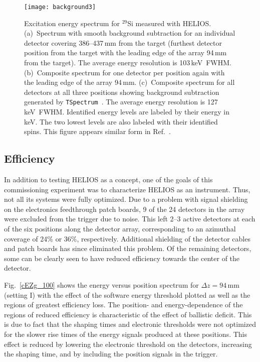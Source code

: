 \begin{figure}[hb!]
\centering
\texttt{[image: background3]}
\caption[Excitation energy spectrum for $^{29}$Si measured with HELIOS]{Excitation energy spectrum for $^{29}$Si measured with HELIOS.  
(a)~Spectrum with smooth background subtraction for an individual detector covering 386--437\,mm from the target (furthest detector position from the target with the leading edge of the array 94\,mm from the target).  The average energy resolution is 103\,keV~FWHM.  
(b)~Composite spectrum for one detector per position again with the leading edge of the array 94\,mm. 
(c)~Composite spectrum for all detectors at all three positions showing background subtraction generated by \texttt{TSpectrum}~\cite{Morhac_2000}.  The average energy resolution is 127\,keV~FWHM.  Identified energy levels are labeled by their energy in keV.  The two lowest levels are also labeled with their identified spins.  This figure appears similar form in Ref.~\cite{Lighthall_2010}.}
\label{qval}
\end{figure}

\subsection{Efficiency}
\label{effic}
In addition to testing HELIOS as a concept, one of the goals of this commissioning experiment was to characterize HELIOS as an instrument.  Thus, not all its systems were fully optimized.  Due to a problem with signal shielding on the electronics feedthrough patch boards, 9 of the 24 detectors in the array were excluded from the trigger due to noise.  This left 2--3 active detectors at each of the six positions along the detector array, corresponding to an azimuthal coverage of 24\% or 36\%, respectively.  Additional shielding of the detector cables and patch boards 
has since eliminated this problem.  Of the remaining detectors, some can be clearly seen to have reduced efficiency towards the center of the detector. %

Fig.~\ref{cEZg_100} shows the energy versus position spectrum for $\Delta z = 94$\,mm (setting I) with the effect of the software energy threshold plotted as well as the regions of greatest efficiency loss.  The position- and energy-dependence of the regions of reduced efficiency is characteristic of the effect of ballistic deficit.  This is due to fact that the shaping times and electronic thresholds were not optimized for the slower rise times of the energy signals produced at these positions.  This effect is reduced by lowering the electronic threshold on the detectors, increasing the shaping time, and by including the position signals in the trigger.

